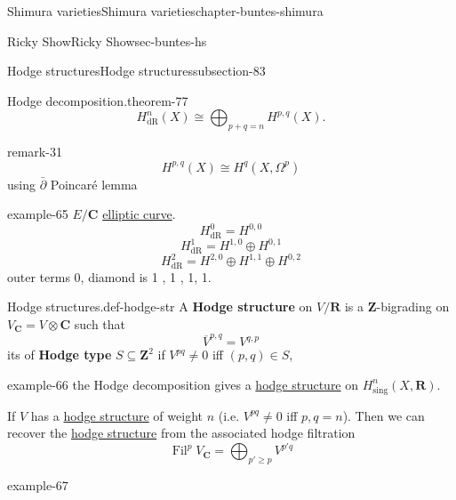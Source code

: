 \documentclass[oneside,10pt,]{book}
\newcommand{\terminology}[1]{\textbf{#1}}
\numberwithin{equation}{section}
\newcommand{\ZZ}{\mathbf{Z}}
\newcommand{\RR}{\mathbf{R}}
\newcommand{\CC}{\mathbf{C}}
\newcommand{\dR}{\mathrm{dR}}
\DeclareMathOperator{\Fil}{Fil}
\begin{document}
\begin{chapterptx}{Shimura varieties}{}{Shimura varieties}{}{}{chapter-buntes-shimura}
\begin{sectionptx}{Ricky Show}{}{Ricky Show}{}{}{sec-buntes-hs}
\begin{subsectionptx}{Hodge structures}{}{Hodge structures}{}{}{subsection-83}
\begin{theorem}{Hodge decomposition.}{}{theorem-77}
\begin{equation*}
H^n_\dR(X) \cong \bigoplus _{p+q =n} H^{p,q}(X)\text{.}
\end{equation*}
%
\end{theorem}
\begin{remark}{}{remark-31}%
\hypertarget{p-1141}{}%
%
\begin{equation*}
H^{p,q} (X) \cong H^q( X, \Omega^p)
\end{equation*}
using \(\bar \partial\) Poincaré lemma%
\end{remark}
\begin{example}{}{example-65}%
\hypertarget{p-1142}{}%
\(E/\CC\) \hyperref[def-supersing-isog-ec]{elliptic curve}.%
\begin{equation*}
H^0_\dR = H^{0,0}
\end{equation*}
%
\begin{equation*}
H^1_\dR = H^{1,0} \oplus H^{0,1}
\end{equation*}
%
\begin{equation*}
H^2_\dR = H^{2,0} \oplus H^{1,1} \oplus H^{0,2}
\end{equation*}
outer terms 0, diamond is  1 , 1 , 1, 1.%
\end{example}
\begin{definition}{Hodge structures.}{def-hodge-str}%
\hypertarget{p-1143}{}%
A \terminology{Hodge structure} on \(V/\RR\) is a \(\ZZ\)-bigrading on \(V_\CC = V \otimes \CC\) such that%
\begin{equation*}
\overline V^{p,q}  = V^{q,p}
\end{equation*}
its of \terminology{Hodge type} \(S\subseteq \ZZ^2\) if \(V^{pq} \ne 0 \) iff \((p,q) \in S\),%
\end{definition}
\begin{example}{}{example-66}%
\hypertarget{p-1144}{}%
the Hodge decomposition gives a \hyperref[def-hodge-str]{hodge structure} on \(H^n_{\mathrm{sing}}(X, \RR)\).%
\end{example}
\hypertarget{p-1145}{}%
If \(V\) has a \hyperref[def-hodge-str]{hodge structure} of weight \(n\) (i.e. \(V^{pq} \ne 0\) iff \(p,q = n\)). Then we can recover the \hyperref[def-hodge-str]{hodge structure} from the associated hodge filtration%
\begin{equation*}
\Fil^p V_\CC = \bigoplus_{p' \ge p} V^{p' q}
\end{equation*}
%
\begin{example}{}{example-67}%
\hypertarget{p-1146}{}%
%
\begin{equation*}

\end{equation*}
\end{example}
\end{subsectionptx}
\end{sectionptx}
\end{chapterptx}
\end{document}

